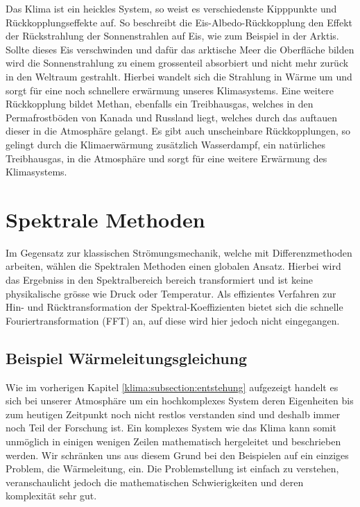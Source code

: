 \begin{refsection}
Das Klima ist ein heickles System, so weist es verschiedenste Kipppunkte und Rückkopplungseffekte auf. So beschreibt die Eis-Albedo-Rückkopplung den Effekt der Rückstrahlung der Sonnenstrahlen auf Eis, wie zum Beispiel in der Arktis. Sollte dieses Eis verschwinden und dafür das arktische Meer die Oberfläche bilden wird die Sonnenstrahlung zu einem grossenteil absorbiert und nicht mehr zurück in den Weltraum gestrahlt. Hierbei wandelt sich die Strahlung in Wärme um und sorgt für eine noch schnellere erwärmung unseres Klimasystems. Eine weitere Rückkopplung bildet Methan, ebenfalls ein Treibhausgas, welches in den Permafrostböden von Kanada und Russland liegt, welches durch das auftauen dieser in die Atmosphäre gelangt. Es gibt auch unscheinbare Rückkopplungen, so gelingt durch die Klimaerwärmung zusätzlich Wasserdampf, ein natürliches Treibhausgas, in die Atmosphäre und sorgt für eine weitere Erwärmung des Klimasystems.


\section{Spektrale Methoden
\label{klima:section:spektrale}}
Im Gegensatz zur klassischen Strömungsmechanik, welche mit Differenzmethoden arbeiten, wählen die Spektralen Methoden einen globalen Ansatz. Hierbei wird das Ergebniss in den Spektralbereich bereich transformiert und ist keine physikalische grösse wie Druck oder Temperatur. Als effizientes Verfahren zur Hin- und Rücktransformation der Spektral-Koeffizienten bietet sich die schnelle Fouriertransformation (FFT) an, auf diese wird hier jedoch nicht eingegangen.


\subsection{Beispiel Wärmeleitungsgleichung}
Wie im vorherigen Kapitel \ref{klima:subsection:entstehung}  aufgezeigt handelt es sich bei unserer Atmosphäre um ein hochkomplexes System deren Eigenheiten bis zum heutigen Zeitpunkt noch nicht restlos verstanden sind und deshalb immer noch Teil der Forschung ist. Ein komplexes System wie das Klima kann somit unmöglich in einigen wenigen Zeilen mathematisch hergeleitet und beschrieben werden. Wir schränken uns aus diesem Grund bei den Beispielen auf ein einziges Problem, die Wärmeleitung, ein. Die Problemstellung ist einfach zu verstehen, veranschaulicht jedoch die mathematischen Schwierigkeiten und deren komplexität sehr gut.


\end{refsection}
